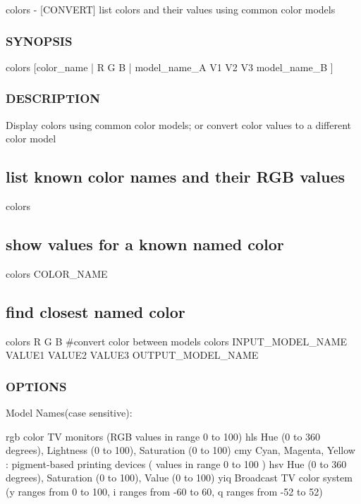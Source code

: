 colors -\/ \mbox{[}C\+O\+N\+V\+E\+RT\mbox{]} list colors and their values using common color models 

\subsubsection*{S\+Y\+N\+O\+P\+S\+IS}

\begin{DoxyVerb}colors [color_name | R G B | model_name_A V1 V2 V3 model_name_B ]
\end{DoxyVerb}


\subsubsection*{D\+E\+S\+C\+R\+I\+P\+T\+I\+ON}

Display colors using common color models; or convert color values to a different color model

\subsection*{list known color names and their R\+GB values}

colors \subsection*{show values for a known named color}

colors C\+O\+L\+O\+R\+\_\+\+N\+A\+ME \subsection*{find closest named color}

colors R G B \#convert color between models colors I\+N\+P\+U\+T\+\_\+\+M\+O\+D\+E\+L\+\_\+\+N\+A\+ME V\+A\+L\+U\+E1 V\+A\+L\+U\+E2 V\+A\+L\+U\+E3 O\+U\+T\+P\+U\+T\+\_\+\+M\+O\+D\+E\+L\+\_\+\+N\+A\+ME

\subsubsection*{O\+P\+T\+I\+O\+NS}

Model Names(case sensitive)\+:

rgb color TV monitors (R\+GB values in range 0 to 100) hls Hue (0 to 360 degrees), Lightness (0 to 100), Saturation (0 to 100) cmy Cyan, Magenta, Yellow \+: pigment-\/based printing devices ( values in range 0 to 100 ) hsv Hue (0 to 360 degrees), Saturation (0 to 100), Value (0 to 100) yiq Broadcast TV color system (y ranges from 0 to 100, i ranges from -\/60 to 60, q ranges from -\/52 to 52)

